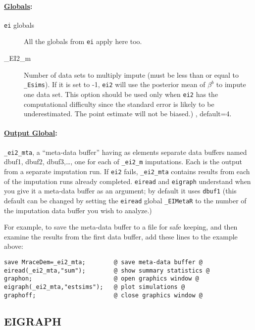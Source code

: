 \documentclass[11pt,titlepage]{article}
\begin{document}
\paragraph{\underline{Globals}:}
\begin{description}
\item[\texttt{ei} globals] All the globals from \texttt{ei} apply here
  too.

\item[\_EI2\_m] Number of data sets to multiply impute (must be less
than or equal to \texttt{\_Esims}). If it is set to -1, \texttt{ei2}
will use the posterior mean of $\beta^b$ to impute one data set. This
option should be used only when \texttt{ei2} has the computational
difficulty since the standard error is likely to be
underestimated. The point estimate will not be biased.) , default=4.

\end{description}

\paragraph{\underline{Output Global}:}
\texttt{\_ei2\_mta}, a ``meta-data buffer'' having as elements
separate data buffers named dbuf1, dbuf2, dbuf3,\ldots, one for each
of \texttt{\_ei2\_m} imputations.  Each is the output from a separate
imputation run.  If \texttt{ei2} fails, \texttt{\_ei2\_mta} contains
results from each of the imputation runs already completed.
\texttt{eiread} and \texttt{eigraph} understand when you give it a
meta-data buffer as an argument; by default it uses \texttt{dbuf1}
(this default can be changed by setting the \texttt{eiread} global
\texttt{\_EIMetaR} to the number of the imputation data buffer you wish
to analyze.)

For example, to save the meta-data buffer to a file for safe keeping,
and then examine the results from the first data buffer, add these
lines to the example above:
\begin{verbatim}
save MraceDem=_ei2_mta;        @ save meta-data buffer @
eiread(_ei2_mta,"sum");        @ show summary statistics @
graphon;                       @ open graphics window @
eigraph(_ei2_mta,"estsims");   @ plot simulations @
graphoff;                      @ close graphics window @
\end{verbatim}

\subsection{EIGRAPH} \label{eigraph}
\end{document}
